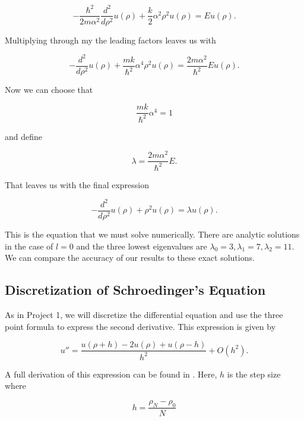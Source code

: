 \documentclass[%
oneside,                 %
final,                   %
10pt]{article}
\begin{document}
\begin{equation*}
  -\frac{\hbar^2}{2 m \alpha^2} \frac{d^2}{d\rho^2} u(\rho) 
       + \frac{k}{2} \alpha^2\rho^2u(\rho)  = E u(\rho) .
\end{equation*}

Multiplying through my the leading factors leaves us with

\begin{equation*}
  -\frac{d^2}{d\rho^2} u(\rho) 
       + \frac{mk}{\hbar^2} \alpha^4\rho^2u(\rho)  = \frac{2m\alpha^2}{\hbar^2}E u(\rho) .
\end{equation*}

Now we can choose that

\begin{equation*}
\frac{mk}{\hbar^2} \alpha^4 = 1
\end{equation*}

and define

\begin{equation*}
\lambda = \frac{2m\alpha^2}{\hbar^2}E.
\end{equation*}

That leaves us with the final expression

\begin{equation*}
  -\frac{d^2}{d\rho^2} u(\rho) + \rho^2u(\rho)  = \lambda u(\rho) .
\end{equation*}

This is the equation that we must solve numerically.  There are analytic solutions in the case of $l=0$ and the three lowest eigenvalues are $\lambda_0=3,\lambda_1=7,\lambda_2=11$. We can compare the accuracy of our results to these exact solutions.

\subsection{Discretization of Schroedinger's Equation}

As in Project 1, we will discretize the differential equation and use the three point formula to express the second derivative.  This expression is given by
 
\begin{equation*}
    u''=\frac{u(\rho+h) -2u(\rho) +u(\rho-h)}{h^2} +O(h^2).
    \label{eq:diffoperation}
\end{equation*}

A full derivation of this expression can be found in \cite{LectureNotes}.  Here, $h$ is the step size where 

\begin{equation*}
  h=\frac{\rho_N-\rho_0 }{N}
\end{equation*}
\end{document}
